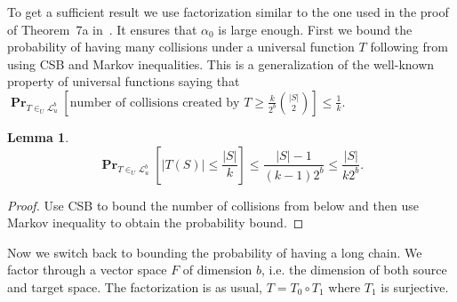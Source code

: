 \documentclass{article}
\newcommand{\linearmaps}[2]{\mathcal{L}_{#1}^{#2}}
\newcommand{\probs}[2]{\operatorname{\mathbf{Pr}}_{{#1}}\left[{#2}\right]}
\newtheorem{lemma}{Lemma}
\begin{document}
To get a sufficient result we use factorization similar to the one used in the proof of Theorem~7a in~\cite{alonetal}. It ensures that $\alpha_0$ is large enough.
First we bound the probability of having many collisions under a universal function $T$ following from using CSB and Markov inequalities.
This is a generalization of the well-known property of universal functions saying that $\probs{T \in_U \linearmaps{u}{b}}{\mbox{number of collisions created by }T \geq \frac{k}{2^b} \binom{|S|}{2}} \leq \frac{1}{k}$.
\begin{lemma}
\label{lemma-collisions-general}
\[
\probs{T \in_U \linearmaps{u}{b}}{|T(S)| \leq \frac{|S|}{k}} \leq \frac{|S| - 1}{(k - 1)2^b} \leq \frac{|S|}{k2^b}.
\]
\end{lemma}
\begin{proof}
Use CSB to bound the number of collisions from below and then use Markov inequality to obtain the probability bound.
\end{proof}

Now we switch back to bounding the probability of having a long chain.
We factor through a vector space $F$ of dimension $b$, i.e. the dimension of both source and target space.
The factorization is as usual, $T = T_0 \circ T_1$ where $T_1$ is surjective.
\end{document}
